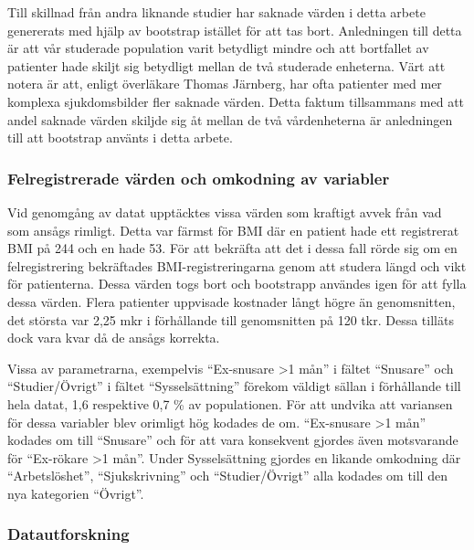 Till skillnad från andra liknande studier har saknade värden i detta arbete genererats med hjälp av bootstrap istället för att tas bort. Anledningen till detta är att vår studerade population varit betydligt mindre och att bortfallet av patienter hade skiljt sig betydligt mellan de två studerade enheterna. Värt att notera är att, enligt överläkare Thomas Järnberg,  har ofta patienter med mer komplexa sjukdomsbilder fler saknade värden. Detta faktum tillsammans med att andel saknade värden skiljde sig åt mellan de två vårdenheterna är anledningen till att bootstrap använts i detta arbete.

\subsubsection{Felregistrerade värden och omkodning av variabler}
Vid genomgång av datat upptäcktes vissa värden som kraftigt avvek från vad som ansågs rimligt. Detta var färmst för BMI där en patient hade ett registrerat BMI på 244 och en hade 53. För att bekräfta att det i dessa fall rörde sig om en felregistrering bekräftades BMI-registreringarna genom att studera längd och vikt för patienterna. Dessa värden togs bort och bootstrapp användes igen för att fylla dessa värden. Flera patienter uppvisade kostnader långt högre än genomsnitten, det största var 2,25 mkr i förhållande till genomsnitten på 120 tkr. Dessa tilläts dock vara kvar då de ansågs korrekta.

Vissa av parametrarna, exempelvis “Ex-snusare \textgreater1 mån” i fältet “Snusare” och “Studier/Övrigt” i fältet “Sysselsättning” förekom väldigt sällan i förhållande till hela datat, 1,6 respektive 0,7 \% av populationen. För att undvika att variansen för dessa variabler blev orimligt hög kodades de om. “Ex-snusare \textgreater1 mån” kodades om till “Snusare” och för att vara konsekvent gjordes även motsvarande för “Ex-rökare \textgreater1 mån”. Under Sysselsättning gjordes en likande omkodning där “Arbetslöshet”, “Sjukskrivning” och “Studier/Övrigt” alla kodades om till den nya kategorien “Övrigt”.

\subsubsection{Datautforskning}

